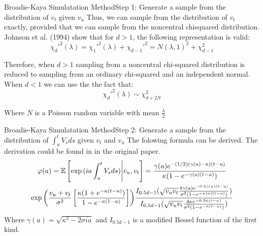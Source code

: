 \begin{frame}{Broadie-Kaya Simulatation Method}{Step 1: Generate a sample from the distribution of $v_t$ given $v_u$}
    Thus, we can sample from the distribution of $v_t$ exactly,
    provided that we can sample from the noncentral chisquared distribution.
    Johnson et al. (1994) show that for $d > 1$, the following representation is valid:
    \begin{equation}
        \chi_d'^{2}(\lambda) = \chi_1'^{2}(\lambda) + \chi_{d-1}'^{2} = N(\lambda, 1)^2 + \chi_{d-1}^{2}
    \end{equation}

    Therefore,  when $d > 1$ sampling from a noncentral chi-squared distribution
    is reduced to sampling from an ordinary chi-squared and
    an independent normal.
    When $d < 1$ we can use the the fact that:
    \begin{equation}
        \chi_d'^{2}(\lambda) \sim \chi_{d + 2N}^{2}
    \end{equation}

    Where $N$ is a Poisson random variable with mean $\frac{\lambda}{2}$

    
\end{frame}

\begin{frame}{Broadie-Kaya Simulatation Method}{Step 2:  Generate a sample from the distribution of $\int_{u}^t V_s ds$ given $v_t$ and $v_u$}
    The folowing formula can be derived. The derivation could be found in in the original paper.
    \begin{multline}
        \varphi(a) = \mathbb{E}\left[  \exp{(ia\int_{u}^t V_s ds)} \Bigg| v_u, v_t\right] = \frac{\gamma(a)e^{-(1/2)(\gamma(a) - \kappa)(t - u)}}{\kappa(1-e^{-\gamma(a)(t-u)})} \\
        \exp{\left(\frac{v_u + v_t}{\sigma^2} \left[  \frac{\kappa(1+e^{-\kappa(t-u)})}{1-e^{-\kappa(1-u)}}                 \right]     \right)}
        \frac{I_{0.5d-1}(\sqrt{v_uv_t}\frac{4\gamma(a)e^{-0.5\gamma(a)(t-u)}}{\sigma^2(1-e^{-\kappa(a)(t-u)})})}{I_{0.5d-1}(\sqrt{v_uv_t}\frac{4\kappa e^{-0.5\kappa(t-u)}}{\sigma^2(1-e^{-\kappa(t-u)})})}
    \end{multline}
    Where $\gamma(a) = \sqrt{\kappa^2 - 2\sigma i a}$ and $I_{0.5d-1}$ is a modified  Bessel function of the first kind.

\end{frame}



